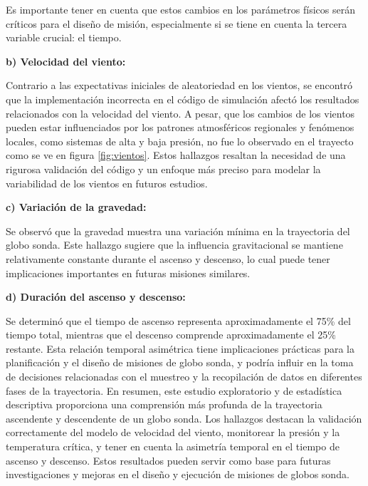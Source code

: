 Es importante tener en cuenta que estos cambios en los parámetros físicos serán críticos para el diseño de misión, especialmente si se tiene en cuenta la tercera variable crucial: el tiempo. 

\textbf{b) Velocidad del viento:}

Contrario a las expectativas iniciales de aleatoriedad en los vientos, se encontró que la implementación incorrecta en el código de simulación afectó los resultados relacionados con la velocidad del viento. A pesar,  que los cambios de los  vientos pueden estar influenciados por los patrones atmosféricos regionales y fenómenos locales, como sistemas de alta y baja presión, no fue lo observado en el trayecto como se ve en figura \ref{fig:vientos}. Estos hallazgos resaltan la necesidad de una rigurosa validación del código y un enfoque más preciso para modelar la variabilidad de los vientos en futuros estudios.  


\textbf{c) Variación de la gravedad:}

Se observó que la gravedad muestra una variación mínima en la trayectoria del globo sonda. Este hallazgo sugiere que la influencia gravitacional se mantiene relativamente constante durante el ascenso y descenso, lo cual puede tener implicaciones importantes en futuras misiones similares.

\textbf{d) Duración del ascenso y descenso:}

Se determinó que el tiempo de ascenso representa aproximadamente el 75\% del tiempo total, mientras que el descenso comprende aproximadamente el 25\% restante. Esta relación temporal asimétrica tiene implicaciones prácticas para la planificación y el diseño de misiones de globo sonda, y podría influir en la toma de decisiones relacionadas con el muestreo y la recopilación de datos en diferentes fases de la trayectoria.
En resumen, este estudio exploratorio y de estadística descriptiva proporciona una comprensión más profunda de la trayectoria ascendente y descendente de un globo sonda. Los hallazgos destacan la validación correctamente del modelo de velocidad del viento, monitorear la presión y la temperatura crítica, y tener en cuenta la asimetría temporal en el tiempo de ascenso y descenso. Estos resultados pueden servir como base para futuras investigaciones y mejoras en el diseño y ejecución de misiones de globos sonda.

